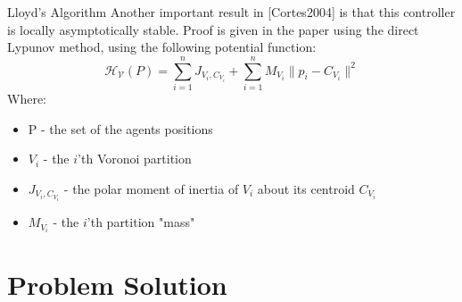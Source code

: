 \documentclass[t]{beamer}
\newcommand{\norm}[1]{\lVert #1 \rVert}
\begin{document}
\begin{frame}[label=lloydsalg7]{Lloyd's Algorithm}
Another important result in [Cortes2004] is that this controller is locally asymptotically stable. Proof is given in the paper using the direct Lypunov method, using the following potential function:
\begin{equation*}
\mathcal{H_{V}}\left( P \right) = \sum_{i=1}^{n} J_{V_i,C_{V_i}} + \sum_{i=1}^{n} M_{V_i} \norm{p_i - C_{V_i}}^2
\end{equation*}
Where:
\begin{itemize}
\item P - the set of the agents positions
\item $V_i$ - the $i$'th Voronoi partition
\item $J_{V_i,C_{V_i}}$ - the polar moment of inertia of $V_i$ about its centroid $C_{V_i}$
\item $M_{V_i}$ - the $i$'th partition "mass"
\end{itemize}
\end{frame}


\section[Problem Solution]{Problem Solution}
\end{document}
